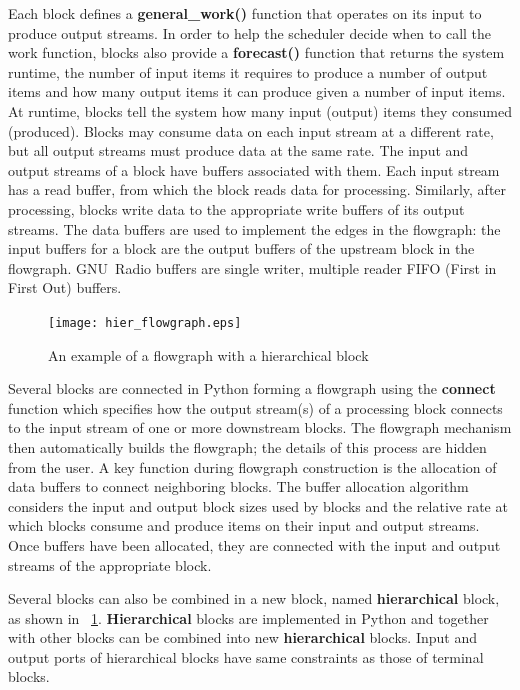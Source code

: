 Each block defines a \textbf{general\_work()} function that operates on its input to produce output streams. In order to help the scheduler decide when to call the work function, blocks also provide a \textbf{forecast()} function that returns the system runtime, the number of input items it requires to produce a number of output items and how many output items it can produce given a number of input items. At runtime, blocks tell the system how many input (output) items they consumed (produced). Blocks may consume data on each input stream at a different rate, but all output streams must produce data at the same rate. The input and output streams of a block have buffers associated with them. Each input stream has a read buffer, from which the block reads data for processing. Similarly, after processing, blocks write data to the appropriate write buffers of its output streams. The data buffers are used to implement the edges in the flowgraph: the input buffers for a block are the output buffers of the upstream block in the flowgraph. GNU~Radio buffers are single writer, multiple reader FIFO (First in First Out) buffers.
%
\begin{figure}[thb]
\centering
\texttt{[image: hier\_flowgraph.eps]}
\caption{An example of a flowgraph with a hierarchical block}\label{fig:hier_flowgraph}
\end{figure}
%
Several blocks are connected in Python forming a flowgraph using the \textbf{connect} function which specifies how the output stream(s) of a processing block connects to the input stream of one or more downstream blocks. The flowgraph mechanism then automatically builds the flowgraph; the details of this process are hidden from the user. A key function during flowgraph construction is the allocation of data buffers to connect neighboring blocks. The buffer allocation algorithm considers the input and output block sizes used by blocks and the relative rate at which blocks consume and produce items on their input and output streams. Once buffers have been allocated, they are connected with the input and output streams of the appropriate block.

Several blocks can also be combined in a new block, named \textbf{hierarchical} block, as shown in ~\cref{fig:hier_flowgraph}. \textbf{Hierarchical} blocks are implemented in Python and together with other blocks can be combined into new \textbf{hierarchical} blocks. Input and output ports of hierarchical blocks have same constraints as those of terminal blocks.

